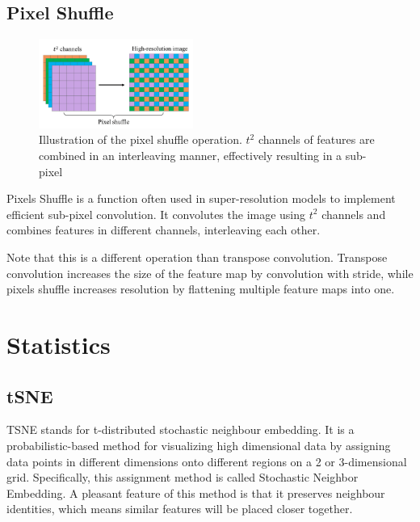\section{Pixel Shuffle}
\label{app:ml:pix_shuf}

\begin{figure}
    \centering
    \includegraphics[width=0.45\textwidth]{images/appendix/pixel_shuffle.png}
    \caption[Illustration of the pixel shuffle operation.]{Illustration of the pixel shuffle operation. $t^2$ channels of features are combined in an interleaving manner, effectively resulting in a sub-pixel}
    \label{fig:pixel_shuffle}
\end{figure}

Pixels Shuffle is a function often used in super-resolution models to implement efficient sub-pixel convolution. It convolutes the image using $t^2$ channels and combines features in different channels, interleaving each other. 

Note that this is a different operation than transpose convolution. Transpose convolution increases the size of the feature map by convolution with stride, while pixels shuffle increases resolution by flattening multiple feature maps into one. 



\chapter{Statistics}
\label{app:stat}

\section{tSNE}
\label{app:stat:tsne}
TSNE stands for t-distributed stochastic neighbour embedding. It is a probabilistic-based method for visualizing high dimensional data by assigning data points in different dimensions onto different regions on a 2 or 3-dimensional grid. Specifically, this assignment method is called Stochastic Neighbor Embedding\cite{hintonStochasticNeighborEmbedding2002}. A pleasant feature of this method is that it preserves neighbour identities, which means similar features will be placed closer together.

